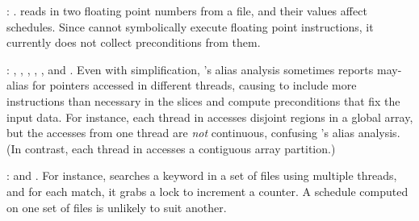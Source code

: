 : \barnes.  \barnes
  reads in two floating point numbers from a file, and their values affect
  schedules.  Since \peregrine cannot symbolically execute floating point
  instructions, it currently does not collect preconditions from them.

: \lun, \radix, \waters, \watern, \ocean,
  and \cholesky.  Even with simplification, \peregrine's alias analysis
  sometimes reports may-alias for pointers accessed in different threads,
  causing \peregrine to include more instructions than necessary in the
  slices and compute preconditions that fix the input data.  For
  instance, each thread in \lun accesses disjoint regions in a global
  array, but the accesses from one thread are \emph{not} continuous,
  confusing \peregrine's alias analysis.  (In contrast, each thread in \luc accesses
  a contiguous array partition.)

: \pfscan and
  \fmm.  For instance, \pfscan searches a keyword in a set of files using
  multiple threads, and for each match, it grabs a lock to increment a
  counter.  A schedule computed on one set of files is unlikely to suit
  another.

